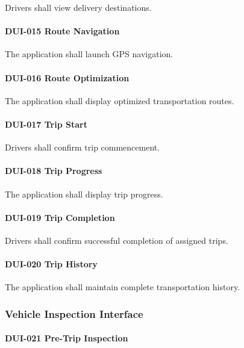 Drivers shall view delivery destinations.

\paragraph{DUI-015 Route Navigation}

The application shall launch GPS navigation.

\paragraph{DUI-016 Route Optimization}

The application shall display optimized transportation routes.

\paragraph{DUI-017 Trip Start}

Drivers shall confirm trip commencement.

\paragraph{DUI-018 Trip Progress}

The application shall display trip progress.

\paragraph{DUI-019 Trip Completion}

Drivers shall confirm successful completion of assigned trips.

\paragraph{DUI-020 Trip History}

The application shall maintain complete transportation history.


\subsubsection*{Vehicle Inspection Interface}

\paragraph{DUI-021 Pre-Trip Inspection}


